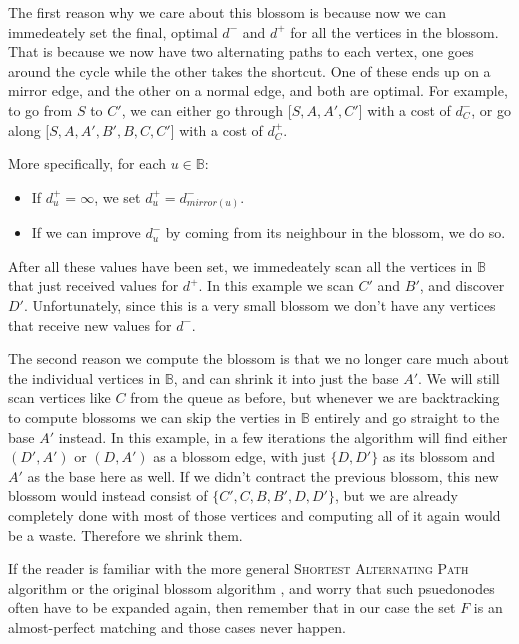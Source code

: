 

The first reason why we care about this blossom is because now we can immedeately set the final, optimal $d^-$ and $d^+$ for all the vertices in the blossom. That is because we now have two alternating paths to each vertex, one goes around the cycle while the other takes the shortcut. One of these ends up on a mirror edge, and the other on a normal edge, and both are optimal. For example, to go from $S$ to $C'$, we can either go through [$S,A,A',C'$] with a cost of $d^-_C$, or go along [$S,A,A',B',B,C,C'$] with a cost of $d^+_C$.

More specifically, for each $u \in \mathbb{B}$: \begin{itemize}
    \item If $d^+_u = \infty$, we set $d^+_u = d^-_{mirror(u)}$.
    \item If we can improve $d^-_u$ by coming from its neighbour in the blossom, we do so.
\end{itemize}
After all these values have been set, we immedeately scan all the vertices in $\mathbb{B}$ that just received values for $d^+$. In this example we scan $C'$ and $B'$, and discover $D'$. Unfortunately, since this is a very small blossom we don't have any vertices that receive new values for $d^-$.



The second reason we compute the blossom is that we no longer care much about the individual vertices in $\mathbb{B}$, and can shrink it into just the base $A'$. We will still scan vertices like $C$ from the queue as before, but whenever we are backtracking to compute blossoms we can skip the verties in $\mathbb{B}$ entirely and go straight to the base $A'$ instead. In this example, in a few iterations the algorithm will find either $(D',A')$ or $(D,A')$ as a blossom edge, with just $\{D,D'\}$ as its blossom and $A'$ as the base here as well. If we didn't contract the previous blossom, this new blossom would instead consist of $\{C',C,B,B',D,D'\}$, but we are already completely done with most of those vertices and computing all of it again would be a waste. Therefore we shrink them. 

If the reader is familiar with the more general \textsc{Shortest Alternating Path} algorithm \cite{source:shortest_alternating_path} or the original blossom algorithm \cite{source:blossom}, and worry that such psuedonodes often have to be expanded again, then remember that in our case the set $F$ is an almost-perfect matching and those cases never happen. 

